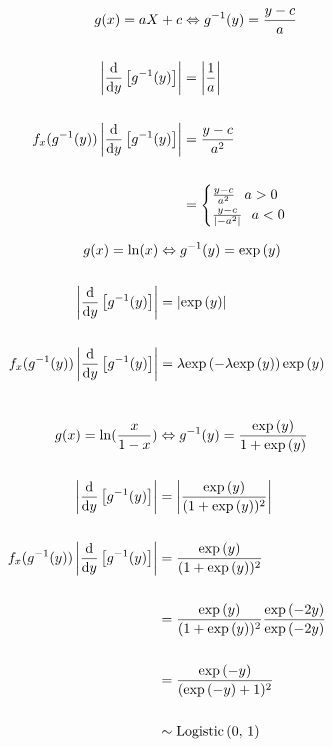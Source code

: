\documentclass[12pt]{article}
\begin{document}
\begin{enumerate}


\begin{align*}
    g(x) = aX + c &\Leftrightarrow  g^{-1}(y) = \frac{y - c}{a} \\ \\ 
    \left|\dfrac{\text{d}}{\text{d} y}\left[g^{-1}(y)\right]\right| &= \left|\frac{1}{a}\right| \\ \\ 
    f_x(g^{-1}(y)) \left|\dfrac{\text{d}}{\text{d} y}\left[g^{-1}(y)\right]\right| &= \frac{y-c}{a^2} \\ \\ 
    &= \begin{cases}
        \frac{y-c}{a^2} ~~ a > 0 \\ 
        \frac{y-c}{\left|-a^2\right|} ~~ a < 0
    \end{cases}
\end{align*}


\begin{align*}
    g(x) = \ln(x) &\Leftrightarrow  g^{-1}(y) = \mathrm{exp}\left(y\right) \\ \\ 
    \left|\dfrac{\text{d}}{\text{d} y}\left[g^{-1}(y)\right]\right| &= \left|\mathrm{exp}\left(y\right)\right| \\ \\  
    f_x(g^{-1}(y)) \left|\dfrac{\text{d}}{\text{d} y}\left[g^{-1}(y)\right]\right| &= \lambda\mathrm{exp}\left(-\lambda\mathrm{exp}\left(y\right)\right) \mathrm{exp}\left(y\right)\\ \\
\end{align*}



\begin{align*}
    g(x) = \ln(\frac{x}{1-x}) &\Leftrightarrow  g^{-1}(y) = \frac{\mathrm{exp}\left(y\right)}{1 + \mathrm{exp}\left(y\right)} \\ \\ 
    \left|\dfrac{\text{d}}{\text{d} y}\left[g^{-1}(y)\right]\right| &= \left|\frac{\mathrm{exp}\left(y\right)}{(1 + \mathrm{exp}\left(y\right))^2}\right| \\ \\ 
    f_x(g^{-1}(y)) \left|\dfrac{\text{d}}{\text{d} y}\left[g^{-1}(y)\right]\right| &= \frac{\mathrm{exp}\left(y\right)}{(1 + \mathrm{exp}\left(y\right))^2} \\ \\
    &= \frac{\mathrm{exp}\left(y\right)}{(1 + \mathrm{exp}\left(y\right))^2} \frac{\mathrm{exp}\left(-2y\right)}{\mathrm{exp}\left(-2y\right)} \\ \\ 
    &= \frac{\mathrm{exp}\left(-y\right)}{(\mathrm{exp}\left(-y\right) + 1)^2} \\ \\ 
    &\sim \mathrm{Logistic}\left(0,\,1\right)
\end{align*}



\end{enumerate}
\end{document}
